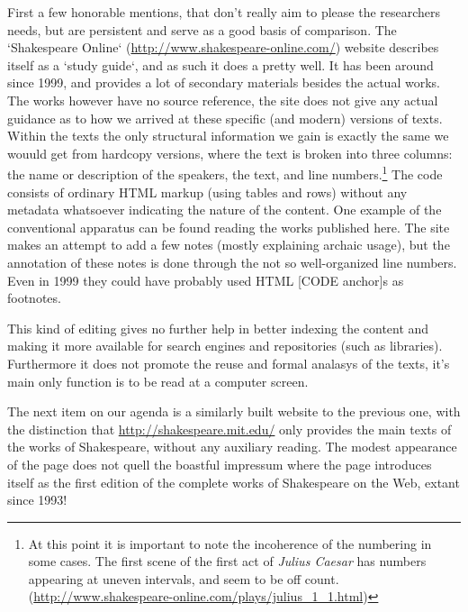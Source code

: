 \documentclass{article}
\begin{document}
First a few honorable mentions, that don't really aim to please the researchers needs, but are persistent and serve as a good basis of comparison. The `Shakespeare Online` (\url{http://www.shakespeare-online.com/}) website describes itself as a `study guide`, and as such it does a pretty well. It has been around since 1999, and provides a lot of secondary materials besides the actual works. The works however have no source reference, the site does not give any actual guidance as to how we arrived at these specific (and modern) versions of texts. Within the texts the only structural information we gain is exactly the same we wouuld get from hardcopy versions, where the text is broken into three columns: the name or description of the speakers, the text, and line numbers.\footnote{At this point it is important to note the incoherence of the numbering in some cases. The first scene of the first act of \textit{Julius Caesar} has numbers appearing at uneven intervals, and seem to be off count. (\url{http://www.shakespeare-online.com/plays/julius_1_1.html})} The code consists of ordinary HTML markup (using tables and rows) without any metadata whatsoever indicating the nature of the content. One example of the conventional apparatus can be found reading the works published here. The site makes an attempt to add a few notes (mostly explaining archaic usage), but the annotation of these notes is done through the not so well-organized line numbers. Even in 1999 they could have probably used HTML [CODE anchor]s as footnotes.

This kind of editing gives no further help in better indexing the content and making it more available for search engines and repositories (such as libraries). Furthermore it does not promote the reuse and formal analasys of the texts, it's main only function is to be read at a computer screen.

The next item on our agenda is a similarly built website to the previous one, with the distinction that \url{http://shakespeare.mit.edu/} only provides the main texts of the works of Shakespeare, without any auxiliary reading. The modest appearance of the page does not quell the boastful impressum where the page introduces itself as the first edition of the complete works of Shakespeare on the Web, extant since 1993! 
\end{document}
